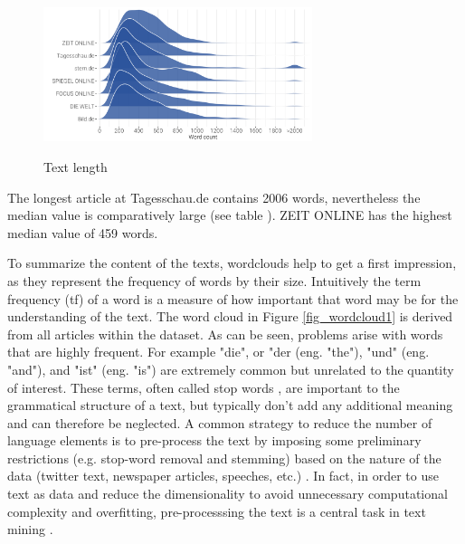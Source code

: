 \documentclass[12pt,a4paper,notitlepage]{article}
\begin{document}
\begin{figure}[H]
	\caption{Text length}
	\begin{center}
		\includegraphics[width=0.7\textwidth]{figs/wordcount.png}
		\label{fig_wordcount}
	\end{center}
\end{figure}

The longest article at Tagesschau.de contains 2006 words, nevertheless the median value is comparatively large (see table \label{t_wordcount}). ZEIT ONLINE has the highest median value of 459 words. 



To summarize the content of the texts, wordclouds help to get a first impression, as they represent the frequency of words by their size. Intuitively the term frequency (tf) of a word is a measure of how important that word may be for the understanding of the text. The word cloud in Figure \ref{fig_wordcloud1} is derived from all articles within the dataset. As can be seen, problems arise with words that are highly frequent. For example "die", or "der (eng. "the"), "und" (eng. "and"), and "ist" (eng. "is") are extremely common but unrelated to the quantity of interest. These terms, often called stop words \citep{gentzkow_text_2017}, are important to the grammatical structure of a text, but typically don't add any additional meaning and can therefore be neglected. A common strategy to reduce the number of language elements is to pre-process the text by imposing some preliminary restrictions (e.g. stop-word removal and stemming) based on the nature of the data (twitter text, newspaper articles, speeches, etc.) \citep{gentzkow_text_2017}. In fact, in order to use text as data and reduce the dimensionality to avoid unnecessary computational complexity and overfitting, pre-processsing the text is a central task in text mining \citep{bholat_text_2015}.  
\end{document}
